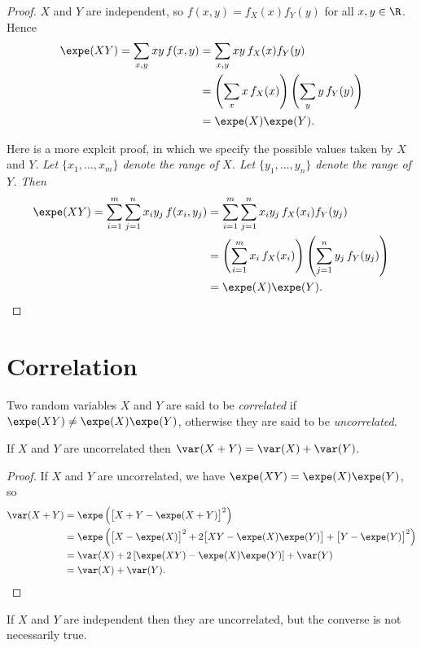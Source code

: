 \begin{proof}
$X$ and $Y$ are independent, so $f(x,y)=f_X(x)f_Y(y)$ for all $x,y\in\R$.
Hence
\begin{align*}
\expe(XY) = \sum_{x,y} xy\, f(x,y)
	& = \sum_{x,y} xy\, f_X(x)f_Y(y) \\
	& = \left(\sum_x x\, f_X(x)\right)\left(\sum_y y\, f_Y(y)\right) \\
	& = \expe(X)\expe(Y).
\end{align*}

Here is a more explcit proof, in which we specify the possible values taken by $X$ and $Y$.
\bit
\it Let $\{x_1,\ldots,x_m\}$ denote the range of $X$.
\it Let $\{y_1,\ldots,y_n\}$ denote the range of $Y$. 
\eit
Then
\begin{align*}
\expe(XY) 
	= \sum_{i=1}^m\sum_{j=1}^n x_i y_j \, f(x_i,y_j) 
	& = \sum_{i=1}^m\sum_{j=1}^n x_i y_j \, f_X(x_i)f_Y(y_j) \\
	& = \left(\sum_{i=1}^m x_i \, f_X(x_i)\right)\left(\sum_{j=1}^n y_j \, f_Y(y_j)\right) \\
	& = \expe(X)\expe(Y).
\end{align*}
\end{proof}

\section{Correlation}

\begin{definition} 
Two random variables $X$ and $Y$ are said to be \emph{correlated} if $\expe(XY)\neq\expe(X)\expe(Y)$, otherwise they are said to be \emph{uncorrelated}.
\end{definition}

\begin{theorem}\label{thm:additivity_of_variance}
If $X$ and $Y$ are uncorrelated then $\var(X+Y) = \var(X) + \var(Y)$.
\end{theorem}

\begin{proof}
If $X$ and $Y$ are uncorrelated, we have $\expe(XY)=\expe(X)\expe(Y)$, so
\begin{align*}
\var(X+Y)	& = \expe\left(\big[X+Y - \expe(X+Y)\big]^2\right) \\
			& = \expe\left(\big[X-\expe(X)\big]^2 + 2\big[XY-\expe(X)\expe(Y)\big] + \big[Y-\expe(Y)\big]^2\right) \\
			& = \var(X) + 2\left[\expe(XY)-\expe(X)\expe(Y)\right] + \var(Y) \\
			& = \var(X) + \var(Y).
\end{align*}
\vspace*{-3ex}
\end{proof}
\begin{remark}
If $X$ and $Y$ are independent then they are uncorrelated, but the converse is not necessarily true.
\end{remark}

